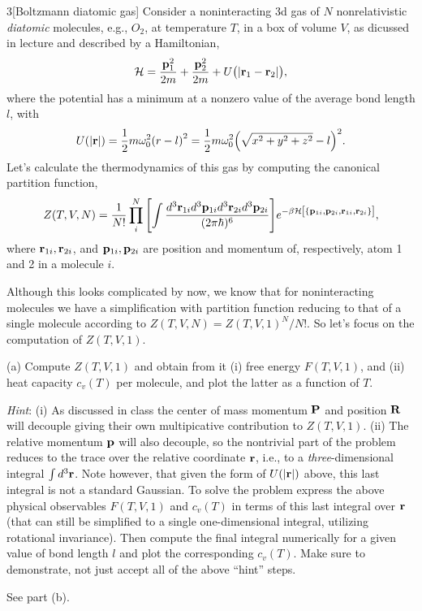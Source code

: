 \documentclass[12pt]{article}
\begin{document}
\newpage
\begin{problem}{3}[Boltzmann diatomic gas]
Consider a noninteracting 3d gas of $N$ nonrelativistic \textit{diatomic}
molecules, e.g., $O_2$, at temperature $T$, in a box of volume $V$, as dicussed
in lecture and described by a Hamiltonian,
\begin{equation}
    \mathcal{H}=\frac{\vb{p}_1^2}{2m}+\frac{\vb{p}_2^2}{2m}+U\qty(\abs{\vb{r}_1-\vb{r}_2})
    ,
\end{equation}
where the potential has a minimum at a nonzero value of the average bond length
$l$, with
\begin{equation}
    U(\abs{\vb{r}})=\frac12m\omega_0^2\qty(r-l)^2=\frac12m\omega_0^2\qty(\sqrt{x^2+y^2+z^2}-l)^2.
\end{equation}
Let's calculate the thermodynamics of this gas by computing the canonical
partition function,
\begin{equation}
    Z(T,V,N)=\frac1{N!}\prod_i^N\qty[\int\frac{d^3\vb{r}_{1i}d^3\vb{p}_{1i}d^3\vb{r}_{2i}d^3\vb{p}_{2i}}{(2\pi\hbar)^{6}}]e^{-\beta\mathcal{H}\qty[\qty{\vb{p}_{1i},\vb{p}_{2i},\vb{r}_{1i},\vb{r}_{2i}}]},
\end{equation}
where $\vb{r}_{1i},\vb{r}_{2i}$, and $\vb{p}_{1i},\vb{p}_{2i}$ are position and
momentum of, respectively, atom 1 and 2 in a molecule $i$.

Although this looks complicated by now, we know that for noninteracting
molecules we have a simplification with partition function reducing to that of a
single molecule according to $Z(T,V,N)=Z(T,V,1)^N/N!$. So let's focus on the
computation of $Z(T,V,1)$.

(a) Compute $Z(T,V,1)$ and obtain from it (i) free energy $F(T,V,1)$, and (ii)
heat capacity $c_v(T)$ per molecule, and plot the latter as a function of $T$.

\textit{Hint}: (i) As discussed in class the center of mass momentum $\vb{P}$
and position $\vb{R}$ will decouple giving their own multipicative contribution
to $Z(T,V,1)$. (ii) The relative momentum $\vb{p}$ will also decouple, so the
nontrivial part of the problem reduces to the trace over the relative coordinate
$\vb{r}$, i.e., to a \textit{three}-dimensional integral $\int d^3\vb{r}$. Note
however, that given the form of $U(\abs{\vb{r}})$ above, this last integral is
not a standard Gaussian. To solve the problem express the above physical
observables $F(T,V,1)$ and $c_v(T)$ in terms of this last integral over
$\vb{r}$ (that can still be simplified to a single one-dimensional integral,
utilizing rotational invariance). Then compute the final integral numerically
for a given value of bond length $l$ and plot the corresponding $c_v(T)$. Make
sure to demonstrate, not just accept all of the above ``hint'' steps.
\begin{solution}
See part (b).
\end{solution}


\end{problem}
\end{document}
